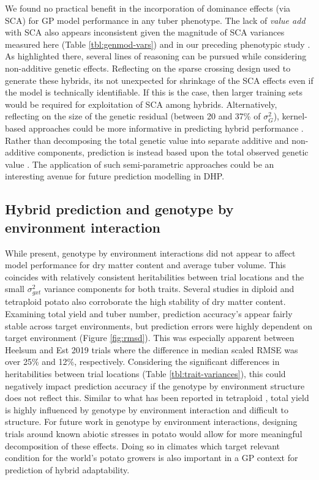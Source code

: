 We found no practical benefit in the incorporation of dominance effects (via SCA) for GP model performance in any tuber phenotype. The lack of \emph{value add} with SCA also appears inconsistent given the magnitude of SCA variances measured here (Table \ref{tbl:genmod-vars}) and in our preceding phenotypic study \parencite{Adams2022}. As highlighted there, several lines of reasoning can be pursued while considering non-additive genetic effects. Reflecting on the sparse crossing design used to generate these hybrids, its not unexpected for shrinkage of the SCA effects even if the model is technically identifiable. If this is the case, then larger training sets would be required for exploitation of SCA among hybrids. Alternatively, reflecting on the size of the genetic residual (between 20 and 37\% of \(\sigma_G^2\)), kernel-based approaches could be more informative in predicting hybrid performance \parencite{Gianola2008, Crossa2019a}. Rather than decomposing the total genetic value into separate additive and non-additive components, prediction is instead based upon the total observed genetic value \parencite{Bernardo2020}. The application of such semi-parametric approaches could be an interesting avenue for future prediction modelling in DHP.

\subsection{Hybrid prediction and genotype by environment interaction}

While present, genotype by environment interactions did not appear to affect model performance for dry matter content and average tuber volume. This coincides with relatively consistent heritabilities between trial locations and the small \(\sigma_{gxt}^2\) variance components for both traits. Several studies in diploid \parencite{Stockem2020} and tetraploid \parencite{Endelman2018, Cuevas2022, Ortiz2022, Wilson2023} potato also corroborate the high stability of dry matter content. Examining total yield and tuber number, prediction accuracy's appear fairly stable across target environments, but prediction errors were highly dependent on target environment (Figure \ref{fig:rmsd}). This was especially apparent between Heelsum and Est 2019 trials where the difference in median scaled RMSE was over 25\% and 12\%, respectively. Considering the significant differences in heritabilities between trial locations (Table \ref{tbl:trait-variances}), this could negatively impact prediction accuracy if the genotype by environment structure does not reflect this. Similar to what has been reported in tetraploid \parencite{Cuevas2022, Ortiz2022, Wilson2023}, total yield is highly influenced by genotype by environment interaction and difficult to structure. For future work in genotype by environment interactions, designing trials around known abiotic stresses in potato would allow for more meaningful decomposition of these effects. Doing so in climates which target relevant condition for the world's potato growers is also important in a GP context for prediction of hybrid adaptability.

